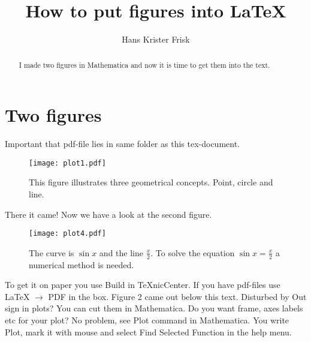 \documentclass[11pt,a4paper]{article}
\begin{document}
\title{How to put figures into LaTeX}
\author{Hans Krister Frisk}
\maketitle

\begin{abstract}
 I made two figures in Mathematica and now it is time to get
 them into the text.
\end{abstract}



\section{Two figures}

Important that pdf-file lies in same folder as this tex-document.
\begin{figure}
\centering
\texttt{[image: plot1.pdf]}
\caption{ This figure illustrates three geometrical concepts.
Point, circle and line.}
\end{figure}

There it came! Now we have a look at the second figure.
  
\begin{figure}
\centering
\texttt{[image: plot4.pdf]}
\caption{ The curve is $\sin x$ and the line $\frac{x}{2}$. To solve
the equation $\sin x = \frac{x}{2}$ a numerical method is needed. 
}
\end{figure}
 
To get it on paper you use Build in TeXnicCenter. If you have pdf-files
use LaTeX $\rightarrow$ PDF in the box. Figure 2 came out below this text.
Disturbed by Out sign in plots? You can cut them in Mathematica. Do you want frame, axes labels etc
for your plot? No problem, see Plot command in Mathematica. You write Plot, mark it with mouse and select
Find Selected Function in the help menu.
\end{document}
